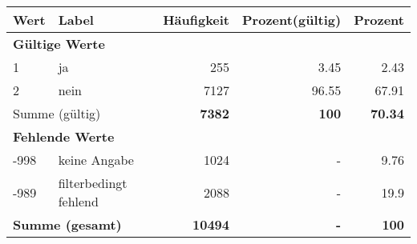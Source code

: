      \begin{longtable}{lXrrr}
     \toprule
     \textbf{Wert} & \textbf{Label} & \textbf{Häufigkeit} & \textbf{Prozent(gültig)} & \textbf{Prozent} \\
     \endhead
     \midrule
     \multicolumn{5}{l}{\textbf{Gültige Werte}}\\

     1 &
     \multicolumn{1}{X}{ ja   } &


       \num{255} &
       \num[round-mode=places,round-precision=2]{3,45} &
         \num[round-mode=places,round-precision=2]{2,43} \\

     2 &
     \multicolumn{1}{X}{ nein   } &


       \num{7127} &
       \num[round-mode=places,round-precision=2]{96,55} &
         \num[round-mode=places,round-precision=2]{67,91} \\
     \midrule
     \multicolumn{2}{l}{Summe (gültig)} &
       \textbf{\num{7382}} &
     \textbf{100} &
       \textbf{\num[round-mode=places,round-precision=2]{70,34}} \\
     \multicolumn{5}{l}{\textbf{Fehlende Werte}}\\
       -998 &
       keine Angabe &
         \num{1024} &
        - &
         \num[round-mode=places,round-precision=2]{9,76} \\
       -989 &
       filterbedingt fehlend &
         \num{2088} &
        - &
         \num[round-mode=places,round-precision=2]{19,9} \\
     \midrule
     \multicolumn{2}{l}{\textbf{Summe (gesamt)}} &
          \textbf{\num{10494}} &
        \textbf{-} &
        \textbf{100} \\
     \bottomrule
     \end{longtable}
     
